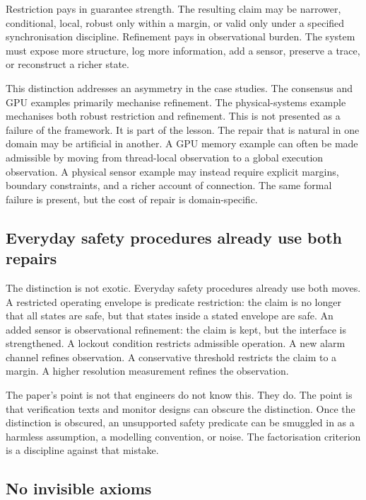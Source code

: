 \documentclass[a4paper,11pt]{article}
\begin{document}
Restriction pays in guarantee strength. The resulting claim may be narrower,
conditional, local, robust only within a margin, or valid only under a specified
synchronisation discipline. Refinement pays in observational burden. The system
must expose more structure, log more information, add a sensor, preserve a
trace, or reconstruct a richer state.

This distinction addresses an asymmetry in the case studies. The consensus and
GPU examples primarily mechanise refinement. The physical-systems example
mechanises both robust restriction and refinement. This is not presented as a
failure of the framework. It is part of the lesson. The repair that is natural in
one domain may be artificial in another. A GPU memory example can often be made
admissible by moving from thread-local observation to a global execution
observation. A physical sensor example may instead require explicit margins,
boundary constraints, and a richer account of connection. The same formal
failure is present, but the cost of repair is domain-specific.

\subsection{Everyday safety procedures already use both repairs}
\label{subsec:safety-practice}

The distinction is not exotic. Everyday safety procedures already use both
moves. A restricted operating envelope is predicate restriction: the claim is no
longer that all states are safe, but that states inside a stated envelope are
safe. An added sensor is observational refinement: the claim is kept, but the
interface is strengthened. A lockout condition restricts admissible operation. A
new alarm channel refines observation. A conservative threshold restricts the
claim to a margin. A higher resolution measurement refines the observation.

The paper's point is not that engineers do not know this. They do. The point is
that verification texts and monitor designs can obscure the distinction. Once
the distinction is obscured, an unsupported safety predicate can be smuggled in
as a harmless assumption, a modelling convention, or noise. The factorisation
criterion is a discipline against that mistake.

\subsection{No invisible axioms}
\end{document}
